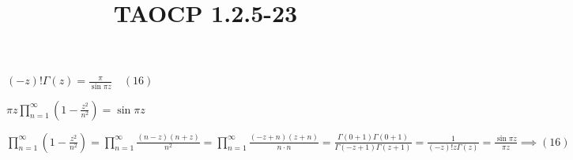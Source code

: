 \documentclass{article}
\title{TAOCP 1.2.5\mbox{-}23}
\begin{document}
\maketitle

\( (-z)! \Gamma(z) = \frac{\pi}{\sin \pi z}\quad (16) \)

\( \pi z \prod_{n=1}^\infty (1- \frac{z^{2}}{n^{2}}) = \sin \pi z \)

\( \prod_{n=1}^\infty (1- \frac{z^{2}}{n^{2}}) = \prod_{n=1}^\infty \frac{(n-z)(n+z)}{n^{2}} = \prod_{n=1}^\infty \frac{(-z+n)(z+n)}{n \cdot n} = \frac{\Gamma(0+1)\Gamma(0+1)}{\Gamma(-z+1)\Gamma(z+1)} = \frac{1}{(-z)!z \Gamma(z)} = \frac{\sin \pi z}{\pi z} \implies (16) \)
\end{document}
